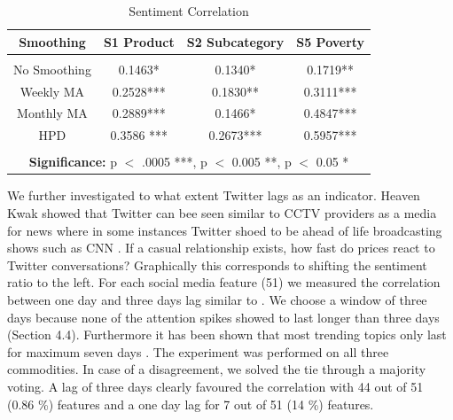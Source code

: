 \begin{table}[h]   
\centering
 \begin{tabular}{  c  | c  | c | c }
            
    \textbf{Smoothing}  & \textbf{S1 Product} & \textbf{S2 Subcategory} &\textbf{S5 Poverty} \\
  \hline 
  &&& \\
  No Smoothing & 0.1463*  &   0.1340* &    0.1719**  \\
  
  Weekly MA &    0.2528***   & 0.1830** &   0.3111***\\

  Monthly MA &  0.2889***  & 0.1466* & 0.4847*** \\

  HPD &  0.3586 ***  &  0.2673*** &   0.5957***  \\
  

\hline 

\multicolumn{4}{c}{\null}\\

\multicolumn{4}{c}{\textbf{Significance:} p $<$ .0005 ***, p $<$ 0.005 **, p $<$ 0.05 *}\\
\hline  

\end{tabular}
\caption{Sentiment Correlation}
\label{tab:smoothing_corr}


\end{table}


We further investigated to what extent Twitter lags as an indicator. Heaven Kwak showed that Twitter can bee seen similar to CCTV providers as a media for news where in some instances Twitter shoed to be ahead of life broadcasting shows such as CNN \cite{Kwak10}. If a casual relationship exists, how fast do prices react to Twitter conversations? Graphically this corresponds to shifting the sentiment ratio to the left. For each social media feature (51) we measured the correlation between one day and three days lag similar to \cite{Si_exploitingtopic}. We choose a window of three days because  none of the attention spikes showed to last longer than three days (Section 4.4). Furthermore it has been shown  that most trending topics only last for maximum seven days \cite{Kwak10}. The experiment was performed on all three commodities. In case of a disagreement, we solved the tie through a majority voting. A lag of three days clearly favoured the correlation with 44 out of 51 (0.86 \%) features and a one day lag for 7 out of 51 (14 \%) features. 



